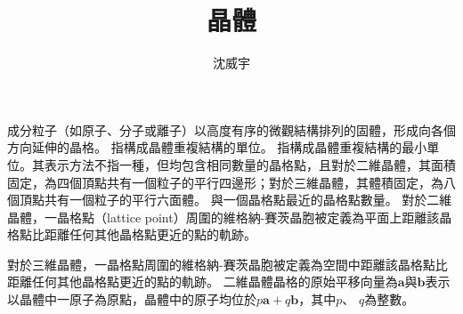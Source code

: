 \documentclass[a4paper,12pt]{article}
\begin{document}
\title{晶體}
\author{沈威宇}
\date{\temtoday}
\titletocdoc
{}
成分粒子（如原子、分子或離子）以高度有序的微觀結構排列的固體，形成向各個方向延伸的晶格。 
指構成晶體重複結構的單位。
指構成晶體重複結構的最小單位。其表示方法不指一種，但均包含相同數量的晶格點，且對於二維晶體，其面積固定，為四個頂點共有一個粒子的平行四邊形；對於三維晶體，其體積固定，為八個頂點共有一個粒子的平行六面體。
與一個晶格點最近的晶格點數量。
對於二維晶體，一晶格點（lattice point）周圍的維格納-賽茨晶胞被定義為平面上距離該晶格點比距離任何其他晶格點更近的點的軌跡。

對於三維晶體，一晶格點周圍的維格納-賽茨晶胞被定義為空間中距離該晶格點比距離任何其他晶格點更近的點的軌跡。
二維晶體晶格的原始平移向量為$\mathbf {a}$與$\mathbf{b}$表示以晶體中一原子為原點，晶體中的原子均位於$p\mathbf {a} +q\mathbf {b} $，其中$p$、 $q$為整數。
\end{document}
